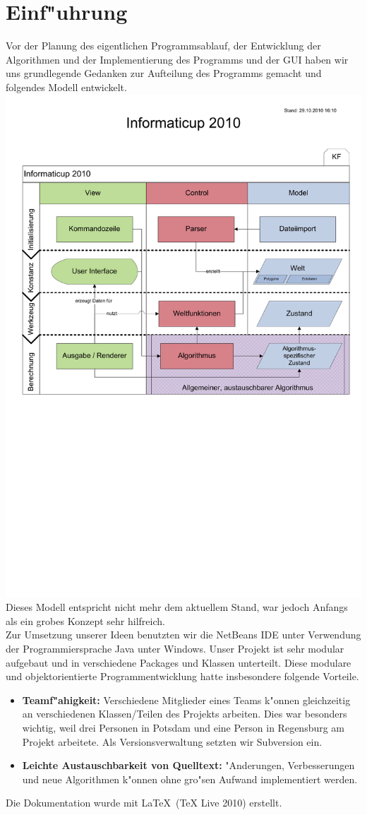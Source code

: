 \section{Einf"uhrung}
Vor der Planung des eigentlichen Programmsablauf, der Entwicklung der Algorithmen und der Implementierung des Programms und der GUI haben wir uns grundlegende Gedanken zur Aufteilung des Programms gemacht und folgendes Modell entwickelt.\\
\includegraphics[width=1.0\textwidth]{scheme.pdf}
Dieses Modell entspricht nicht mehr dem aktuellem Stand, war jedoch Anfangs als ein grobes Konzept sehr hilfreich.\\
Zur Umsetzung unserer Ideen benutzten wir die NetBeans IDE unter Verwendung der Programmiersprache Java unter Windows. Unser Projekt ist sehr modular aufgebaut und in verschiedene Packages und Klassen unterteilt. Diese modulare und objektorientierte Programmentwicklung hatte insbesondere folgende Vorteile.
\begin{itemize}
\item \textbf{Teamf"ahigkeit:} Verschiedene Mitglieder eines Teams k"onnen gleichzeitig an verschiedenen Klassen/Teilen des Projekts arbeiten. Dies war besonders wichtig, weil drei Personen in Potsdam und eine Person in Regensburg am Projekt arbeitete. Als Versionsverwaltung setzten wir Subversion ein.
\item \textbf{Leichte Austauschbarkeit von Quelltext:} "Anderungen, Verbesserungen und neue Algorithmen k"onnen ohne gro"sen Aufwand implementiert werden.
\end{itemize}
Die Dokumentation wurde mit \LaTeX\ (TeX Live 2010) erstellt.